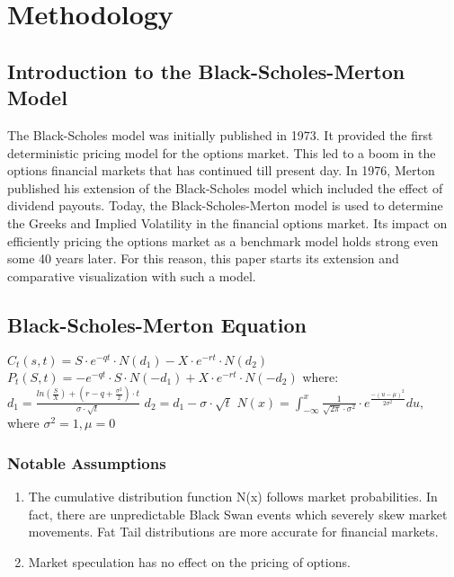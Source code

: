\documentclass{article}
\begin{document}
\section{Methodology}

\subsection{Introduction to the Black-Scholes-Merton Model}
\begin{flushleft}
The Black-Scholes model was initially published in 1973. It provided the first deterministic pricing model for the options market. This led to a boom in the options financial markets that has continued till present day. In 1976, Merton published his extension of the Black-Scholes model which included the effect of dividend payouts. Today, the Black-Scholes-Merton model is used to determine the Greeks and Implied Volatility in the financial options market. Its impact on efficiently pricing the options market as a benchmark model holds strong even some 40 years later. For this reason, this paper starts its extension and comparative visualization with such a model. 
\end{flushleft}
\subsection{Black-Scholes-Merton Equation}
\begin{flushleft}
$C_t(s,t) = S \cdot e^{-qt}  \cdot N (d_1) - X\cdot e^{-rt} \cdot N(d_2)$
\newline\newline
$P_t(S,t) = -e^{-qt}  \cdot  S \cdot N (-d_1) + X\cdot e^{-rt} \cdot N(-d_2)$
\newline\newline
where: 
\newline\newline
$d_1 = \frac {ln(\frac{S}{X}) + (r-q+ \frac{\sigma^2}{2}) \cdot t}{\sigma \cdot \sqrt {t}}$
\newline\newline
$d_2 = d_1 - \sigma \cdot \sqrt{t}$
\newline\newline
$N(x) = \int_{-\infty}^{x} {\frac {1}{\sqrt{2\pi}\cdot \sigma^2}\cdot e ^{\frac{-(u-\mu)^2}{2\sigma^2}} du},$
where $\sigma^2 = 1, \mu = 0$
\end{flushleft}

\subsubsection {Notable Assumptions}
\begin{flushleft}
\begin{enumerate}
\item The cumulative distribution function N(x) follows market probabilities. In fact, there are unpredictable Black Swan events which severely skew market movements. Fat Tail distributions are more accurate for financial markets. 
\item  Market speculation has no effect on the pricing of options.
\end{enumerate}

\end{flushleft}
\end{document}
